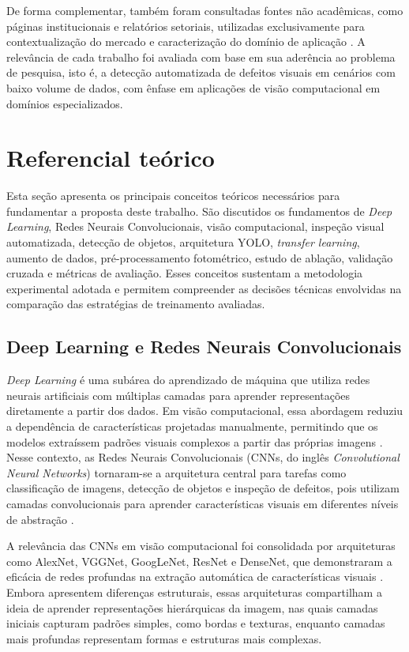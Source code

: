 \documentclass[
    12pt,                %
    openright,           %
    oneside,             %
    a4paper,             %
    english,             %
    brazil               %
]{abntex2}
\begin{document}
De forma complementar, também foram consultadas fontes não acadêmicas, 
como páginas institucionais e relatórios setoriais, utilizadas 
exclusivamente para contextualização do mercado e caracterização do 
domínio de aplicação \cite{BRI2026}. A relevância de cada trabalho foi 
avaliada com base em sua aderência ao problema de pesquisa, isto é, a 
detecção automatizada de defeitos visuais em cenários com baixo volume 
de dados, com ênfase em aplicações de visão computacional em domínios 
especializados.

\section{Referencial teórico}
\label{sec:referencial}

Esta seção apresenta os principais conceitos teóricos necessários para fundamentar a proposta deste trabalho. São discutidos os fundamentos de \textit{Deep Learning}, Redes Neurais Convolucionais, visão computacional, inspeção visual automatizada, detecção de objetos, arquitetura YOLO, \textit{transfer learning}, aumento de dados, pré-processamento fotométrico, estudo de ablação, validação cruzada e métricas de avaliação. Esses conceitos sustentam a metodologia experimental adotada e permitem compreender as decisões técnicas envolvidas na comparação das estratégias de treinamento avaliadas.

\subsection{Deep Learning e Redes Neurais Convolucionais}
\label{subsec:dl_cnn}

\textit{Deep Learning} é uma subárea do aprendizado de máquina que utiliza
redes neurais artificiais com múltiplas camadas para aprender representações
diretamente a partir dos dados. Em visão computacional, essa abordagem reduziu
a dependência de características projetadas manualmente, permitindo que os
modelos extraíssem padrões visuais complexos a partir das próprias imagens
\cite{Zheng2021}. Nesse contexto, as Redes Neurais Convolucionais (CNNs, do
inglês \textit{Convolutional Neural Networks}) tornaram-se a arquitetura central
para tarefas como classificação de imagens, detecção de objetos e inspeção de
defeitos, pois utilizam camadas convolucionais para aprender características
visuais em diferentes níveis de abstração \cite{Hussain2023}.

A relevância das CNNs em visão computacional foi consolidada por arquiteturas
como AlexNet, VGGNet, GoogLeNet, ResNet e DenseNet, que demonstraram a eficácia
de redes profundas na extração automática de características visuais
\cite{Zheng2021,Hussain2023}. Embora apresentem diferenças estruturais, essas
arquiteturas compartilham a ideia de aprender representações hierárquicas da
imagem, nas quais camadas iniciais capturam padrões simples, como bordas e
texturas, enquanto camadas mais profundas representam formas e estruturas mais
complexas.
\end{document}
